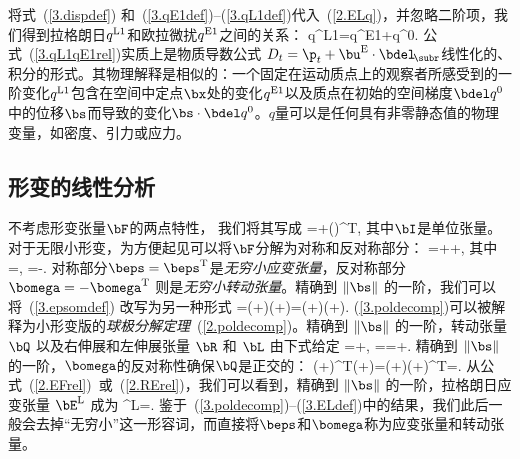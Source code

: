 将式~(\ref{3.dispdef})
和~(\ref{3.qE1def})--(\ref{3.qL1def})代入~(\ref{2.ELq})，并忽略二阶项，我们得到拉格朗日$q^{\rm L1}$和欧拉微扰$q^{\rm E1}$之间的关系：
\eq
\label{3.qL1qE1rel}
q^{\rm L1}=q^{\rm E1}+\bs\cdot\bdel q^0.
\en
公式~(\ref{3.qL1qE1rel})实质上是物质导数公式
%
%
$D_t=\p_t+\bu^{\rm E}\cdot\bdel_{\!\subr}$线性化的、积分的形式。其物理解释是相似的：一个固定在运动质点上的观察者所感受到的一阶变化$q^{\rm L1}$包含在空间中定点$\bx$处的变化$q^{\rm E1}$以及质点在初始的空间梯度$\bdel q^0$中的位移$\bs$而导致的变化$\bs\cdot\bdel q^0$。$q$量可以是任何具有非零静态值的物理变量，如密度、引力或应力。
%
%

%
%
%
%
%

\subsection{形变的线性分析}
%
%


不考虑形变张量$\bF$的两点特性，
%
%
我们将其写成
\eq
\label{3.Fgrads}
\bF=\bI+(\bdel\bs)^{\rm T},
\en
其中$\bI$是单位张量。对于无限小形变，为方便起见可以将$\bF$分解为对称和反对称部分：
\eq
\label{3.epsomdef}
\bF=\bI+\beps +\bomega,
\en
其中
\eq
\beps=,\qquad
\bomega=-.
\en
{}%
%
%
%
对称部分$\beps=\beps^{\rm T}$是{\em 无穷小应变张量}，反对称部分$\bomega=-\bomega^{\rm T}$ 则是{\em 无穷小转动张量}。精确到 $\|\bs\|$ 的一阶，我们可以将~(\ref{3.epsomdef}) 改写为另一种形式
\eq
\label{3.poldecomp}
\bF=(\bI+\bomega)\cdot(\bI+\beps)=(\bI+\beps)\cdot(\bI+\bomega).
\en
{}%
(\ref{3.poldecomp})可以被解释为小形变版的{\em 球极分解定理}~(\ref{2.poldecomp})。精确到 $\|\bs\|$ 的一阶，转动张量 $\bQ$ 以及右伸展和左伸展张量 $\bR$ 和 $\bL$ 由下式给定
\eq
\label{3.Qdef}
\bQ=\bI+\bomega,\qquad
\bR=\bL=\bI+\beps.
\en
精确到 $\|\bs\|$ 的一阶，$\bomega$的反对称性确保$\bQ$是正交的：
\eq
(\bI+\bomega)^{\rm T}\cdot(\bI+\bomega)=(\bI+\bomega)\cdot(\bI+\bomega)^{\rm T}=\bI.
\en
从公式~(\ref{2.EFrel})~或~(\ref{2.RErel})，我们可以看到，精确到 $\|\bs\|$ 的一阶，拉格朗日应变张量 $\bE^{\rm L}$ 成为
%
%
\eq
\label{3.ELdef}
\bE^{\rm L}=\beps.
\en
鉴于~(\ref{3.poldecomp})--(\ref{3.ELdef})中的结果，我们此后一般会去掉“无穷小”这一形容词，而直接将$\beps$和$\bomega$称为应变张量和转动张量。

